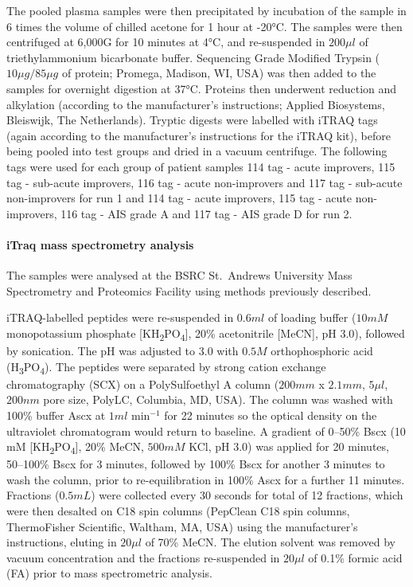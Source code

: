 \documentclass[9pt,lineno]{elife}
\begin{document}
The pooled plasma samples were then precipitated by incubation of the sample in 6 times the volume of chilled acetone for 1 hour at -20°C.
The samples were then centrifuged at 6,000G for 10 minutes at 4°C, and re-suspended in \(200\mu l\) of triethylammonium bicarbonate buffer.
Sequencing Grade Modified Trypsin (\(10\mu g/85\mu g\) of protein; Promega, Madison, WI, USA) was then added to the samples for overnight digestion at 37°C.
Proteins then underwent reduction and alkylation (according to the manufacturer's instructions; Applied Biosystems, Bleiswijk, The Netherlands).
Tryptic digests were labelled with iTRAQ tags (again according to the manufacturer's instructions for the iTRAQ kit), before being pooled into test groups and dried in a vacuum centrifuge.
The following tags were used for each group of patient samples 114 tag - acute improvers, 115 tag - sub-acute improvers, 116 tag - acute non-improvers and 117 tag - sub-acute non-improvers for run 1 and 114 tag - acute improvers, 115 tag - acute non-improvers, 116 tag - AIS grade A and 117 tag - AIS grade D for run 2.

\hypertarget{itraq-mass-spectrometry-analysis}{%
\paragraph{iTraq mass spectrometry analysis}\label{itraq-mass-spectrometry-analysis}}

The samples were analysed at the BSRC St.~Andrews University Mass Spectrometry and Proteomics Facility using methods previously described.

iTRAQ-labelled peptides were re-suspended in \(0.6 ml\) of loading buffer (\(10 mM\) monopotassium phosphate {[}KH\textsubscript{2}PO\textsubscript{4}{]}, 20\% acetonitrile {[}MeCN{]}, pH 3.0), followed by sonication.
The pH was adjusted to \(3.0\) with \(0.5 M\) orthophosphoric acid (H\textsubscript{3}PO\textsubscript{4}).
The peptides were separated by strong cation exchange chromatography (SCX) on a PolySulfoethyl A column (\(200 mm\) x \(2.1 mm\), \(5\mu l\), \(200 nm\) pore size, PolyLC, Columbia, MD, USA).
The column was washed with 100\% buffer Ascx at \(1 ml\) min\(^{-1}\) for 22 minutes so the optical density on the ultraviolet chromatogram would return to baseline.
A gradient of 0--50\% Bscx (10 mM {[}KH\textsubscript{2}PO\textsubscript{4}{]}, 20\% MeCN, \(500 mM\) KCl, pH 3.0) was applied for 20 minutes, 50--100\% Bscx for 3 minutes, followed by 100\% Bscx for another 3 minutes to wash the column, prior to re-equilibration in 100\% Ascx for a further 11 minutes.
Fractions (\(0.5 mL\)) were collected every 30 seconds for total of 12 fractions, which were then desalted on C18 spin columns (PepClean C18 spin columns, ThermoFisher Scientific, Waltham, MA, USA) using the manufacturer's instructions, eluting in \(20\mu l\) of 70\% MeCN.
The elution solvent was removed by vacuum concentration and the fractions re-suspended in \(20 \mu l\) of 0.1\% formic acid (FA) prior to mass spectrometric analysis.
\end{document}
